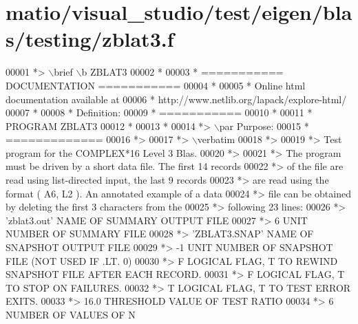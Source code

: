 \hypertarget{matio_2visual__studio_2test_2eigen_2blas_2testing_2zblat3_8f_source}{}\section{matio/visual\+\_\+studio/test/eigen/blas/testing/zblat3.f}
\label{matio_2visual__studio_2test_2eigen_2blas_2testing_2zblat3_8f_source}

\begin{DoxyCode}
00001 \textcolor{comment}{*> \(\backslash\)brief \(\backslash\)b ZBLAT3}
00002 \textcolor{comment}{*}
00003 \textcolor{comment}{*  =========== DOCUMENTATION ===========}
00004 \textcolor{comment}{*}
00005 \textcolor{comment}{* Online html documentation available at }
00006 \textcolor{comment}{*            http://www.netlib.org/lapack/explore-html/ }
00007 \textcolor{comment}{*}
00008 \textcolor{comment}{*  Definition:}
00009 \textcolor{comment}{*  ===========}
00010 \textcolor{comment}{*}
00011 \textcolor{comment}{*       PROGRAM ZBLAT3}
00012 \textcolor{comment}{* }
00013 \textcolor{comment}{*}
00014 \textcolor{comment}{*> \(\backslash\)par Purpose:}
00015 \textcolor{comment}{*  =============}
00016 \textcolor{comment}{*>}
00017 \textcolor{comment}{*> \(\backslash\)verbatim}
00018 \textcolor{comment}{*>}
00019 \textcolor{comment}{*> Test program for the COMPLEX*16       Level 3 Blas.}
00020 \textcolor{comment}{*>}
00021 \textcolor{comment}{*> The program must be driven by a short data file. The first 14 records}
00022 \textcolor{comment}{*> of the file are read using list-directed input, the last 9 records}
00023 \textcolor{comment}{*> are read using the format ( A6, L2 ). An annotated example of a data}
00024 \textcolor{comment}{*> file can be obtained by deleting the first 3 characters from the}
00025 \textcolor{comment}{*> following 23 lines:}
00026 \textcolor{comment}{*> 'zblat3.out'      NAME OF SUMMARY OUTPUT FILE}
00027 \textcolor{comment}{*> 6                 UNIT NUMBER OF SUMMARY FILE}
00028 \textcolor{comment}{*> 'ZBLAT3.SNAP'     NAME OF SNAPSHOT OUTPUT FILE}
00029 \textcolor{comment}{*> -1                UNIT NUMBER OF SNAPSHOT FILE (NOT USED IF .LT. 0)}
00030 \textcolor{comment}{*> F        LOGICAL FLAG, T TO REWIND SNAPSHOT FILE AFTER EACH RECORD.}
00031 \textcolor{comment}{*> F        LOGICAL FLAG, T TO STOP ON FAILURES.}
00032 \textcolor{comment}{*> T        LOGICAL FLAG, T TO TEST ERROR EXITS.}
00033 \textcolor{comment}{*> 16.0     THRESHOLD VALUE OF TEST RATIO}
00034 \textcolor{comment}{*> 6                 NUMBER OF VALUES OF N}

\end{DoxyCode}
